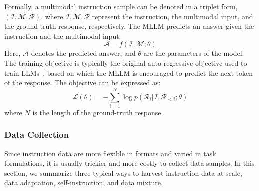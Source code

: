 Formally, a multimodal instruction sample can be denoted in a triplet form, \ie $(\mathcal{I}, \mathcal{M}, \mathcal{R})$, where $\mathcal{I}, \mathcal{M}, \mathcal{R}$ represent the instruction, the multimodal input, and the ground truth response, respectively. The MLLM predicts an answer given the instruction and the multimodal input:
\begin{equation}
    \mathcal{A} = f(\mathcal{I}, \mathcal{M}; \theta)
\end{equation}
Here, $\mathcal{A}$ denotes the predicted answer, and $\theta$ are the parameters of the model. 
The training objective is typically the original auto-regressive objective used to train LLMs~\cite{llava, pmc-vqa, pandagpt, lavin}, based on which the MLLM is encouraged to predict the next token of the response. The objective can be expressed as:
\begin{equation}
\mathcal{L}(\theta) = -\sum_{i=1}^{N} \log p(\mathcal{R}_i|\mathcal{I}, \mathcal{R}_{<i}; \theta)
\end{equation}
where $N$ is the length of the ground-truth response. 

\subsubsection{Data Collection}
\label{sec:train_inst_tune_collect}
Since instruction data are more flexible in formats and varied in task formulations, it is usually trickier and more costly to collect data samples. In this section, we summarize three typical ways to harvest instruction data at scale, \ie data adaptation, self-instruction, and data mixture.

